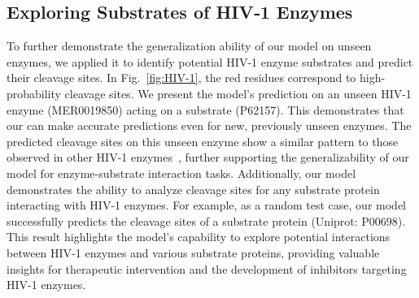 \subsection{Exploring Substrates of HIV‑1 Enzymes}







To further demonstrate the generalization ability of our model on unseen enzymes, we applied it to identify potential HIV-1 enzyme substrates and predict their cleavage sites. In Fig.~\ref{fig:HIV-1}, the red residues correspond to high-probability cleavage sites. We present the model’s prediction on an unseen HIV-1 enzyme (MER0019850) acting on a substrate (P62157). This demonstrates that our {\method} can make accurate predictions even for new, previously unseen enzymes. The predicted cleavage sites on this unseen enzyme show a similar pattern to those observed in other HIV-1 enzymes~\cite{DAUBE1991892,https://doi.org/10.1002/prot.340100102}, further supporting the generalizability of our model for enzyme-substrate interaction tasks. Additionally, our model demonstrates the ability to analyze cleavage sites for any substrate protein interacting with HIV-1 enzymes. For example, as a random test case, our model successfully predicts the cleavage sites of a substrate protein (Uniprot: P00698). This result highlights the model’s capability to explore potential interactions between HIV-1 enzymes and various substrate proteins, providing valuable insights for therapeutic intervention and the development of inhibitors targeting HIV-1 enzymes.












